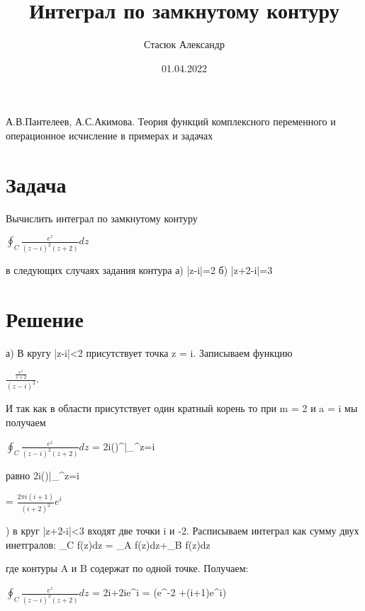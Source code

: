 \documentclass{article}
\title{Интеграл по замкнутому контуру}
\author{Стасюк Александр}
\date{01.04.2022}
\begin{document}
\maketitle
\begin{thebibliography}{1}

А.В.Пантелеев, А.С.Акимова. Теория функций комплексного переменного
и операционное исчисление в примерах и задачах

\end{thebibliography}
\section{Задача}

Вычислить интеграл по замкнутому контуру

$\oint_C \frac{e^z}{(z-i)^2(z+2)}dz$

в следующих случаях задания контура а) |z-i|=2 б) |z+2-i|=3

\section{Решение}

а) В кругу |z-i|<2 присутствует точка z = i. Записываем
функцию

$\frac{\frac{e^z}{z+2}}{(z-i)^2}$.

И так как в области присутствует один кратный корень то при m = 2 и a = i мы получаем

\par \noindent$\oint_C \frac{e^z}{(z-i)^2(z+2)}dz$ = 2\pi i()^\prime\bigg|_^z=i
\par{} равно 2\pi i()|_^z=i
\par\noindent= $\frac{2\pi i(i+1)}{(i+2)^2}e^i$
\par{}) в круг |z+2-i|<3 входят две точки i и -2. Расписываем интеграл как сумму двух инетгралов: \oint_C f(z)dz = \oint_A f(z)dz+\oint_B f(z)dz
\par\noindent где контуры A и B содержат по одной точке. Получаем:
\par\noindent$\oint_C \frac{e^z}{(z-i)^2(z+2)}dz$ = 2\pi i+2\pi ie^i = (e^-2 +(i+1)e^i)
\end{document}
